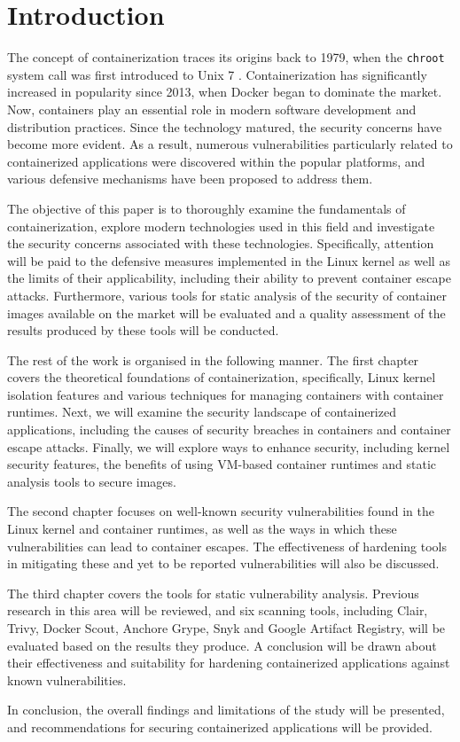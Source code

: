 \section{Introduction}

The concept of containerization traces its origins back to 1979, when the \texttt{chroot} system call was first introduced to Unix 7 \cite{1}. Containerization has significantly increased in popularity since 2013, when Docker began to dominate the market. Now, containers play an essential role in modern software development and distribution practices. Since the technology matured, the security concerns have become more evident. As a result, numerous vulnerabilities particularly related to containerized applications were discovered within the popular platforms, and various defensive mechanisms have been proposed to address them.

The objective of this paper is to thoroughly examine the fundamentals of containerization, explore modern technologies used in this field and investigate the security concerns associated with these technologies. Specifically, attention will be paid to the defensive measures implemented in the Linux kernel as well as the limits of their applicability, including their ability to prevent container escape attacks. Furthermore, various tools for static analysis of the security of container images available on the market will be evaluated and a quality assessment of the results produced by these tools will be conducted.

The rest of the work is organised in the following manner. The first chapter covers the theoretical foundations of containerization, specifically, Linux kernel isolation features and various techniques for managing containers with container runtimes. Next, we will examine the security landscape of containerized applications, including the causes of security breaches in containers and container escape attacks. Finally, we will explore ways to enhance security, including kernel security features, the benefits of using VM-based container runtimes and static analysis tools to secure images.

The second chapter focuses on well-known security vulnerabilities found in the Linux kernel and container runtimes, as well as the ways in which these vulnerabilities can lead to container escapes. The effectiveness of hardening tools in mitigating these and yet to be reported vulnerabilities will also be discussed.

The third chapter covers the tools for static vulnerability analysis. Previous research in this area will be reviewed, and six scanning tools, including Clair, Trivy, Docker Scout, Anchore Grype, Snyk and Google Artifact Registry, will be evaluated based on the results they produce. A conclusion will be drawn about their effectiveness and suitability for hardening containerized applications against known vulnerabilities.

In conclusion, the overall findings and limitations of the study will be presented, and recommendations for securing containerized applications will be provided.
